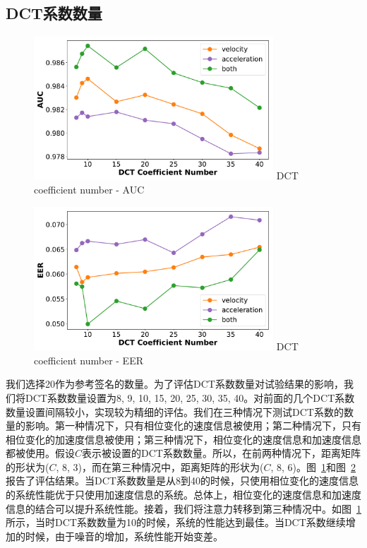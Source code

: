 \subsection{DCT系数数量}
\begin{figure}
  \centering
  \includegraphics[width=0.8\textwidth]{figure/dct_total_auc.pdf}
      {DCT coefficient number - AUC}
  \label{fig:dct-total-auc}
\end{figure}
\begin{figure}
  \centering
  \includegraphics[width=0.8\textwidth]{figure/dct_total_eer.pdf}
      {DCT coefficient number - EER}
  \label{fig:dct-total-eer}
\end{figure}
我们选择20作为参考签名的数量。为了评估DCT系数数量对试验结果的影响，我们将DCT系数数量设置为8, 9, 10, 15, 20, 25, 30, 35, 40。对前面的几个DCT系数数量设置间隔较小，实现较为精细的评估。我们在三种情况下测试DCT系数的数量的影响。第一种情况下，只有相位变化的速度信息被使用；第二种情况下，只有相位变化的加速度信息被使用；第三种情况下，相位变化的速度信息和加速度信息都被使用。假设$C$表示被设置的DCT系数数量。所以，在前两种情况下，距离矩阵的形状为($C$, 8, 3)，而在第三种情况中，距离矩阵的形状为($C$, 8, 6)。图~\ref{fig:dct-total-auc}和图~\ref{fig:dct-total-eer}报告了评估结果。当DCT系数数量是从8到40的时候，只使用相位变化的速度信息的系统性能优于只使用加速度信息的系统。总体上，相位变化的速度信息和加速度信息的结合可以提升系统性能。接着，我们将注意力转移到第三种情况中。如图~\ref{fig:dct-total-auc}所示，当时DCT系数数量为10的时候，系统的性能达到最佳。当DCT系数继续增加的时候，由于噪音的增加，系统性能开始变差。

